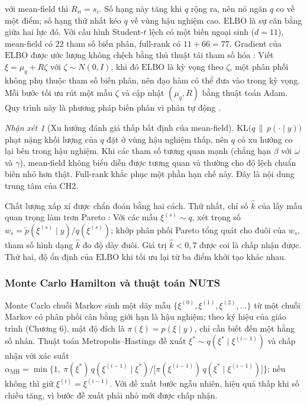 \documentclass[12pt,a4paper]{article}
\theoremstyle{definition}
\theoremstyle{remark}
\newtheorem{nhanxet}{Nhận xét}[section]
\newcommand{\ELBO}{\mathrm{ELBO}}
\newcommand{\KL}{\mathrm{KL}}
\newcommand{\Ncal}{N}
\begin{document}
với mean-field thì $R_{ii}=s_i$. Số hạng này tăng khi $q$ rộng ra, nên nó ngăn $q$ co về một điểm; số hạng thứ nhất kéo $q$ về vùng hậu nghiệm cao. $\ELBO$ là sự cân bằng giữa hai lực đó. Với cấu hình Student-$t$ lệch có một biến ngoại sinh ($d=11$), mean-field có $22$ tham số biến phân, full-rank có $11+66=77$.
Gradient của $\ELBO$ được ước lượng không chệch bằng thủ thuật tái tham số hóa \cite{kingma2014}: Viết $\xi=\mu_q+R\zeta$ với $\zeta\sim\Ncal(0,I)$, khi đó $\ELBO$ là kỳ vọng theo $\zeta$, một phân phối không phụ thuộc tham số biến phân, nên đạo hàm có thể đưa vào trong kỳ vọng. Mỗi bước tối ưu rút một mẫu $\zeta$ và cập nhật $(\mu_q,R)$ bằng thuật toán Adam. Quy trình này là phương pháp biến phân vi phân tự động \cite{kucukelbir2017}.

\begin{nhanxet}[Xu hướng đánh giá thấp bất định của mean-field]
$\KL\big(q\,\|\,p(\cdot\mid y)\big)$ phạt nặng khối lượng của $q$ đặt ở vùng hậu nghiệm thấp, nên $q$ có xu hướng co lại bên trong hậu nghiệm. Khi các tham số tương quan mạnh (chẳng hạn $\beta$ với $\omega$ và $\gamma$), mean-field không biểu diễn được tương quan và thường cho độ lệch chuẩn biên nhỏ hơn thật. Full-rank khắc phục một phần hạn chế này. Đây là nội dung trung tâm của CH2.
\end{nhanxet}

Chất lượng xấp xỉ được chẩn đoán bằng hai cách. Thứ nhất, chỉ số $\hat k$ của lấy mẫu quan trọng làm trơn Pareto \cite{yao2018}: Với các mẫu $\xi^{(s)}\sim q$, xét trọng số $w_s=\tilde p(\xi^{(s)}\mid y)/q(\xi^{(s)})$; khớp phân phối Pareto tổng quát cho đuôi của $w_s$, tham số hình dạng $\hat k$ đo độ dày đuôi. Giá trị $\hat k<0{,}7$ được coi là chấp nhận được. Thứ hai, độ ổn định của $\ELBO$ khi tối ưu lại từ ba điểm khởi tạo khác nhau.

\subsubsection{Monte Carlo Hamilton và thuật toán NUTS}

Monte Carlo chuỗi Markov sinh một dãy mẫu $\{\xi^{(0)},\xi^{(1)},\xi^{(2)},\dots\}$ từ một chuỗi Markov có phân phối cân bằng giới hạn là hậu nghiệm; theo ký hiệu của giáo trình (Chương 6), mật độ đích là $\pi(\xi)=p(\xi\mid y)$, chỉ cần biết đến một hằng số nhân. Thuật toán Metropolis--Hastings đề xuất $\xi^{*}\sim q(\xi^{*}\mid\xi^{(i-1)})$ và chấp nhận với xác suất $\alpha_{\mathrm{MH}}=\min\big\{1,\ \pi(\xi^{*})\,q(\xi^{(i-1)}\mid\xi^{*})\big/\big[\pi(\xi^{(i-1)})\,q(\xi^{*}\mid\xi^{(i-1)})\big]\big\}$; nếu không thì giữ $\xi^{(i)}=\xi^{(i-1)}$. Với đề xuất bước ngẫu nhiên, hiệu quả thấp khi số chiều tăng, vì bước đề xuất phải nhỏ mới được chấp nhận.
\end{document}
